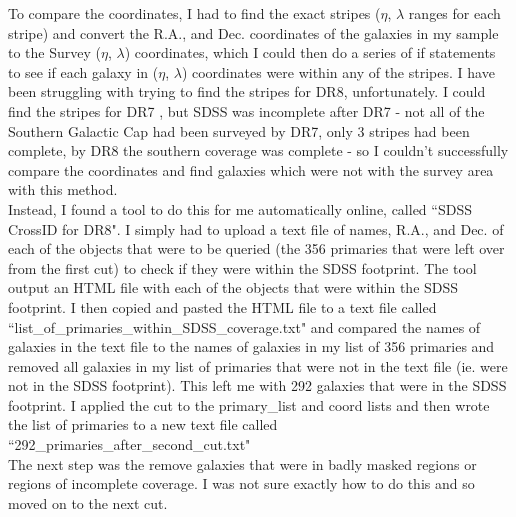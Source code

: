 \documentclass[10pt,letterpaper]{article}
\begin{document}
To compare the coordinates, I had to find the exact stripes ($\eta$, $\lambda$ ranges for each stripe) and convert the R.A., and Dec. coordinates of the galaxies in my sample to the Survey ($\eta$, $\lambda$) coordinates, which I could then do a series of if statements to see if each galaxy in ($\eta$, $\lambda$) coordinates were within any of the stripes. I have been struggling with trying to find the stripes for DR8, unfortunately. I could find the stripes for DR7 \cite{DR7 sky coverage}, but SDSS was incomplete after DR7 - not all of the Southern Galactic Cap had been surveyed by DR7, only 3 stripes had been complete, by DR8 the southern coverage was complete - so I couldn't successfully compare the coordinates and find galaxies which were not with the survey area with this method. \\

Instead, I found a tool to do this for me automatically online, called ``SDSS CrossID for DR8".\cite{CrossID} I simply had to upload a text file of names, R.A., and Dec. of each of the objects that were to be queried (the 356 primaries that were left over from the first cut) to check if they were within the SDSS footprint. The tool output an HTML file with each of the objects that were within the SDSS footprint. I then copied and pasted the HTML file to a text file called ``list\_of\_primaries\_within\_SDSS\_coverage.txt" and compared the names of galaxies in the text file to the names of galaxies in my list of 356 primaries and removed all galaxies in my list of primaries that were not in the text file (ie. were not in the SDSS footprint). This left me with 292 galaxies that were in the SDSS footprint. I applied the cut to the primary\_list and coord lists and then wrote the list of primaries to a new text file called ``292\_primaries\_after\_second\_cut.txt"\\

The next step was the remove galaxies that were in badly masked regions or regions of incomplete coverage. I was not sure exactly how to do this and so moved on to the next cut.\\
\end{document}
